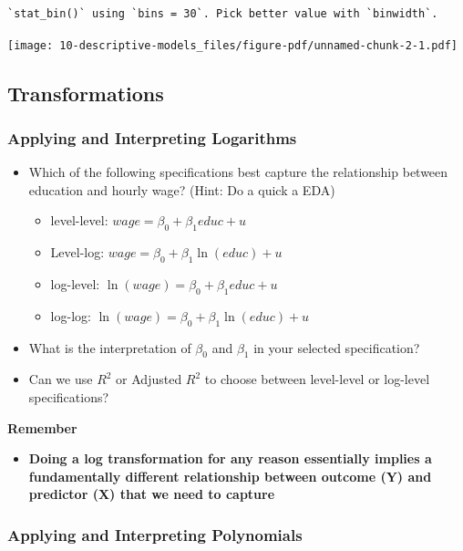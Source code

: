 \documentclass[
  letterpaper,
  DIV=11,
  numbers=noendperiod]{scrreprt}
\providecommand{\tightlist}{%
  \setlength{\itemsep}{0pt}\setlength{\parskip}{0pt}}\usepackage{longtable,booktabs,array}
\begin{document}
\begin{verbatim}
`stat_bin()` using `bins = 30`. Pick better value with `binwidth`.
\end{verbatim}

\texttt{[image: 10-descriptive-models\_files/figure-pdf/unnamed-chunk-2-1.pdf]}

\subsection{Transformations}\label{transformations}

\subsubsection{Applying and Interpreting
Logarithms}\label{applying-and-interpreting-logarithms}

\begin{itemize}
\item
  Which of the following specifications best capture the relationship
  between education and hourly wage? (Hint: Do a quick a EDA)

  \begin{itemize}
  \tightlist
  \item
    level-level: \(wage = \beta_0 + \beta_1 educ + u\)
  \item
    Level-log: \(wage = \beta_0 + \beta_1 \ln(educ)  + u\)
  \item
    log-level: \(\ln(wage) = \beta_0 + \beta_1 educ + u\)
  \item
    log-log: \(\ln(wage) = \beta_0 + \beta_1 \ln(educ) + u\)
  \end{itemize}
\item
  What is the interpretation of \(\beta_0\) and \(\beta_1\) in your
  selected specification?
\item
  Can we use \(R^2\) or Adjusted \(R^2\) to choose between level-level
  or log-level specifications?
\end{itemize}

\textbf{Remember}

\begin{itemize}
\tightlist
\item
  \textbf{Doing a log transformation for any reason essentially implies
  a fundamentally different relationship between outcome (Y) and
  predictor (X) that we need to capture}
\end{itemize}

\subsubsection{Applying and Interpreting
Polynomials}\label{applying-and-interpreting-polynomials}
\end{document}
